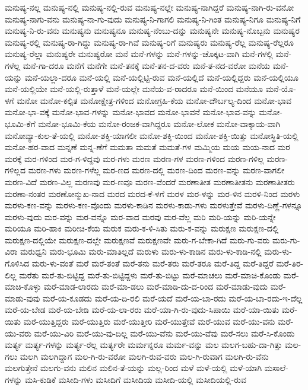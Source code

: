 {ಮನುಷ್ಯ-ನಲ್ಲ
ಮನುಷ್ಯ-ನಲ್ಲಿ
ಮನುಷ್ಯ-ನಲ್ಲಿ-ರುವ
ಮನುಷ್ಯ-ನಲ್ಲೇ
ಮನುಷ್ಯ-ನಾಗಿದ್ದರೆ
ಮನುಷ್ಯ-ನಾಗಿ-ರು-ವನೋ
ಮನುಷ್ಯ-ನಾಗು-ವನು
ಮನುಷ್ಯ-ನಾ-ಗು-ವುದು
ಮನುಷ್ಯ-ನಿ-ಗಾಗಲಿ
ಮನುಷ್ಯ-ನಿ-ಗಿಂತ
ಮನುಷ್ಯ-ನಿಗೂ
ಮನುಷ್ಯ-ನಿಗೆ
ಮನುಷ್ಯ-ನಿ-ರು-ವನು
ಮನುಷ್ಯನು
ಮನುಷ್ಯನೂ
ಮನುಷ್ಯ-ನೆಂಬು-ದನ್ನು
ಮನುಷ್ಯನೇ
ಮನುಷ್ಯ-ನೊಬ್ಬನು
ಮನುಷ್ಯರ
ಮನುಷ್ಯ-ರಲ್ಲಿ
ಮನುಷ್ಯ-ರಾ-ಗಿದ್ದು
ಮನುಷ್ಯ-ರಾ-ಗಿವೆ
ಮನುಷ್ಯ-ರಿಗೆ
ಮನುಷ್ಯರು
ಮನುಷ್ಯ-ರೆಲ್ಲ
ಮನುಷ್ಯ-ರೆಲ್ಲರೂ
ಮನುಷ್ಯ-ರೆಲ್ಲಾ
ಮನುಷ್ಯರೇ
ಮನುಷ್ಯರೋ
ಮನೆ
ಮನೆ-ಗಳನ್ನು
ಮನೆ-ಗಳನ್ನು-ಚೊಕ್ಕಟ-ವಾಗಿ
ಮನೆ-ಗಳಲ್ಲಿ
ಮನೆ-ಗಳೆಲ್ಲ
ಮನೆ-ಗಾ-ದರೂ
ಮನೆಗೆ
ಮನೆಗೇ
ಮನೆ-ತನಕ್ಕೆ
ಮನೆ-ತನ-ದ-ವರು
ಮನೆ-ತ-ನದ-ವರೋ
ಮನೆಯ
ಮನೆ-ಯನ್ನು
ಮನೆ-ಯಲ್ಲಾ-ದರೂ
ಮನೆ-ಯಲ್ಲಿ
ಮನೆ-ಯಲ್ಲಿಟ್ಟಿ-ರುವ
ಮನೆ-ಯಲ್ಲಿದೆ
ಮನೆ-ಯಲ್ಲಿದ್ದರು
ಮನೆ-ಯಲ್ಲಿಯೂ
ಮನೆ-ಯಲ್ಲಿಯೇ
ಮನೆ-ಯಲ್ಲಿ-ರುತ್ತಾಳೆ
ಮನೆ-ಯಲ್ಲೇ
ಮನೆಯ-ವ-ರಾದರೂ
ಮನೆ-ಯಿಂದ
ಮನೆಯೂ
ಮನೆ-ಯೊ-ಳಗೆ
ಮನೋ
ಮನೋ-ಕಲ್ಪಿತ
ಮನೋಕ್ಷೇತ್ರ-ಗಳಿಂದ
ಮನೋಗ್ರಹಿ-ಕೆಯ
ಮನೋ-ದೌರ್ಬಲ್ಯ-ದಿಂದ
ಮನೋ-ಭಾವ
ಮನೋ-ಭಾ-ವಕ್ಕೆ
ಮನೋ-ಭಾವ-ಗಳನ್ನು
ಮನೋ-ಭಾವದ
ಮನೋ-ಭಾವನೆ
ಮನೋ-ಭಾವ-ವನ್ನು
ಮನೋ-ಭೂಮಿ-ಕೆಗೆ
ಮನೋ-ಭೂಮಿ-ಕೆಯ
ಮನೋ-ರಂಜಕ-ವಾಗಿದ್ದರೂ
ಮನೋ-ಲೋಕ
ಮನೋ-ವಾಕ್ಕಾಯ-ವಾಗಿ
ಮನೋವ್ಯಾ-ಕುಲ-ತೆ-ಯಲ್ಲಿ
ಮನೋ-ಶಕ್ತಿ-ಯಾಗಲೀ
ಮನೋ-ಶಕ್ತಿ-ಯಿಂದ
ಮನೋ-ಶಕ್ತಿ-ಯಿತ್ತು
ಮನೋಸ್ಥಿತಿ-ಯಲ್ಲಿ
ಮನೋ-ಹರ-ವಾದ
ಮನ್ನಣೆ
ಮನ್ನ-ಣೆಗೆ
ಮಮತಾ
ಮಮತೆ
ಮಮತೆ-ಗಳ
ಮಮ್ಮಿಯ
ಮಯ
ಮಯ-ನಾದ
ಮರ
ಮರಕ್ಕೆ
ಮರ-ಗಳಿಂದ
ಮರ-ಗ-ಳಿದ್ದವು
ಮರ-ಗಳು
ಮರಣ
ಮರಣ-ಗಳ
ಮರಣ-ಗಳಿಂದ
ಮರಣ-ಗಳಿಲ್ಲ
ಮರಣ-ಗಳಿಲ್ಲದ
ಮರಣ-ಗಳು
ಮರಣ-ಗಳೆಲ್ಲ
ಮರ-ಣದ
ಮರಣ-ದಲ್ಲಿ
ಮರಣ-ದಿಂದ
ಮರಣ-ವನ್ನು
ಮರಣ-ವಾಗಲೀ
ಮರಣ-ವಿದೆ
ಮರಣ-ವಿಲ್ಲ
ಮರಣವು
ಮರ-ಣವೂ
ಮರಣ-ವೆಂದರೆ
ಮರಣಾತೀತ
ಮರಣಾತೀತನು
ಮರಣಾತೀತರು
ಮರಣಾ-ನಂತರ
ಮರಣೋನ್ಮುಖ-ನಾದ
ಮರದ
ಮರದ-ಕೆ-ಳಗೆ
ಮರಳ
ಮರ-ಳನ್ನು
ಮರ-ಳಿನ
ಮರಳಿ-ನಿಂದ
ಮರಳು
ಮರಳು-ಕಣ-ವನ್ನು
ಮರಳು-ಕಣ-ವೊಂದು
ಮರಳು-ಕಾಡಿನ
ಮರಳು-ಕಾಡು-ಗಳು
ಮರಳುತ್ತೇವೆ
ಮರಳು-ದಿಣ್ಣೆ-ಗಳನ್ನೂ
ಮರಳು-ವುದು
ಮರ-ವನ್ನು
ಮರ-ವನ್ನೊ
ಮರ-ವಾದ
ಮರವು
ಮರ-ವೆಲ್ಲ
ಮರಿ
ಮರಿ-ಯನ್ನು
ಮರಿ-ಯನ್ನೇ
ಮರಿಯೂ
ಮರಿ-ಹಾಕಿ
ಮರೀಚಿ-ಕೆಯ
ಮರುಕ
ಮರು-ಕ-ಳಿ-ಸಿತು
ಮರು-ಕ-ವನ್ನು
ಮರುಕ್ಷಣ
ಮರುಕ್ಷಣ-ದಲ್ಲಿ
ಮರುಕ್ಷಣ-ದಲ್ಲಿಯೇ
ಮರುಕ್ಷಣ-ದಲ್ಲೇ
ಮರುಕ್ಷಣವೆ
ಮರುಕ್ಷಣವೇ
ಮರು-ಗ-ಬೇಕಾ-ಗಿದೆ
ಮರು-ಗು-ವರು
ಮರು-ಗು-ವಿರಾ
ಮರುಧ್ವನಿ
ಮರು-ಭೂಮಿ
ಮರು-ಮಾತಿಲ್ಲದೆ
ಮರುಳು
ಮರು-ಳು-ಕಾಡಿನ
ಮರು-ಳು-ಕಾಡಿ-ನಲ್ಲಿ
ಮರು-ಳು-ಗೊಳಿಸಿದ
ಮರು-ಳು-ವಂತೆ
ಮರೆ
ಮರೆ-ತಂತೆ
ಮರೆ-ತನು
ಮರೆ-ತರು
ಮರೆ-ತರೂ
ಮರೆ-ತಿದ್ದ
ಮರೆ-ತಿದ್ದರೆ
ಮರೆ-ತಿರ-ಲಿಲ್ಲ
ಮರೆತು
ಮರೆ-ತು-ಬಿಟ್ಟಿದ್ದ
ಮರೆ-ತು-ಬಿಟ್ಟಿದ್ದಳು
ಮರೆ-ತು-ಬಿಟ್ಟು
ಮರೆ-ಮಾಚಲು
ಮರೆ-ಮಾಚಿ-ಕೊಂಡು
ಮರೆ-ಮಾಚಿ-ಕೊಳ್ಳು
ಮರೆ-ಮಾಡ-ಲಾರದು
ಮರೆ-ಮಾ-ಡಲು
ಮರೆ-ಮಾಡಿ-ದು-ದ-ರಿಂದ
ಮರೆ-ಮಾಡು-ವುದು
ಮರೆ-ಮಾಡು-ವುವು
ಮರೆ-ಯ-ಕೂಡದು
ಮರೆ-ಯ-ದಿ-ರಲಿ
ಮರೆ-ಯದೆ
ಮರೆ-ಯ-ಬಾ-ರದು
ಮರೆ-ಯ-ಬಾ-ರದು-ಇ-ದೆಲ್ಲ
ಮರೆ-ಯ-ಬೇಡ
ಮರೆ-ಯ-ಬೇಡಿ
ಮರೆ-ಯ-ಲಾ-ರರು
ಮರೆ-ಯಾ-ಗಿ-ರು-ವುದು-ಸಿಪಾಯಿ
ಮರೆ-ಯಾ-ಯಿತು
ಮರೆ-ಯಿತು
ಮರೆ-ಯುತ್ತಿದ್ದರು
ಮರೆ-ಯುತ್ತಿರು
ಮರೆ-ಯುತ್ತೀರಿ
ಮರೆ-ಯುತ್ತೇವೆ
ಮರೆ-ಯುವ
ಮರೆ-ಯು-ವನು
ಮರೆ-ಯು-ವರು
ಮರೆ-ಯು-ವಿರಿ
ಮರೆ-ಯು-ವು-ದಿಲ್ಲ
ಮರೆ-ಯು-ವೆನು
ಮರೆ-ಯು-ವೆವು
ಮರೆ-ಸಲು
ಮರೆ-ಸಿ-ಕೊಂಡು
ಮರ್ತ್ಯ
ಮರ್ತ್ಯ-ಗಳನ್ನು
ಮರ್ತ್ಯ-ರೆಲ್ಲ
ಮರ್ತ್ಯರೇ
ಮರ್ಮನ್ನರೂ
ಮರ್ಮ-ವನ್ನು
ಮಲ
ಮಲಗ-ಬಹು-ದಾ-ಗಿತ್ತು
ಮಲ-ಗಲು
ಮಲಗಿ
ಮಲಗಿದ್ದಾಗ
ಮಲ-ಗಿ-ರು-ವರೋ
ಮಲಗಿ-ರುವ-ವರು
ಮಲ-ಗಿ-ರುವಾಗ
ಮಲಗಿ-ರು-ವೆನು
ಮಲಗುತ್ತೇನೆ
ಮಲಗು-ವನು
ಮಲಿನ
ಮಲಿನ-ತೆ-ಯನ್ನು
ಮಲ್ಲ-ರಿಂದ
ಮಳೆ
ಮಳೆ-ಯಲ್ಲಿ
ಮಳೆ-ಯಾಗಿ
ಮಸಾಲೆ-ಗಳನ್ನು
ಮಸಿ-ಕುಡಿಕೆ
ಮಸೀದಿ-ಗಳು
ಮಸೀದಿಗೆ
ಮಸೀದಿಯ
ಮಸೀದಿ-ಯಲ್ಲಿ
ಮಸೀದಿಯಲ್ಲಿ-ರುವ
}
